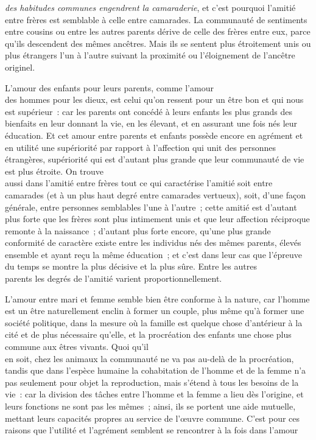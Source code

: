 \documentclass[french,twoside]{book} %
\begin{document}
{\itshape des habitudes communes engendrent la camaraderie}, et c’est pourquoi l’amitié entre frères est semblable à celle entre camarades.  La communauté de sentiments entre cousins ou entre les autres parents dérive de celle des frères entre eux, parce qu’ils descendent des mêmes ancêtres. Mais ils se sentent plus étroitement unis ou plus étrangers l’un à l’autre suivant la proximité ou l’éloignement de l’ancêtre originel.\par
L’amour des enfants pour leurs parents, comme l’amour \\
des hommes pour les dieux, est celui qu’on ressent pour un être bon et qui nous est supérieur : car les parents ont concédé à leurs enfants les plus grands des bienfaits en leur donnant la vie, en les élevant, et en assurant une fois nés leur éducation. Et cet amour entre parents et enfants possède encore en agrément et en utilité une supériorité par rapport à l’affection qui unit des personnes étrangères, supériorité qui est d’autant plus grande que leur communauté de vie est plus étroite. On trouve \\
aussi dans l’amitié entre frères tout ce qui caractérise l’amitié soit entre camarades (et à un plus haut degré entre camarades vertueux), soit, d’une façon générale, entre personnes semblables l’une à l’autre ; cette amitié est d’autant plus forte que les frères sont plus intimement unis et que leur affection réciproque remonte à la naissance ; d’autant plus forte encore, qu’une plus grande conformité de caractère existe entre les individus nés des mêmes parents, élevés ensemble et ayant reçu la même éducation ; et c’est dans leur cas que l’épreuve du temps se montre la plus décisive et la plus sûre. Entre les autres \\
parents les degrés de l’amitié varient proportionnellement.\par
L’amour entre mari et femme semble bien être conforme à la nature, car l’homme est un être naturellement enclin à former un couple, plus même qu’à former une société politique, dans la mesure où la famille est quelque chose d’antérieur à la cité et de plus nécessaire qu’elle, et la procréation des enfants une chose plus commune aux êtres vivants. Quoi qu’il \\
en soit, chez les animaux la communauté ne va pas au-delà de la procréation, tandis que dans l’espèce humaine la cohabitation de l’homme et de la femme n’a pas seulement pour objet la reproduction, mais s’étend à tous les besoins de la vie : car la division des tâches entre l’homme et la femme a lieu dès l’origine, et leurs fonctions ne sont pas les mêmes ; ainsi, ils se portent une aide mutuelle, mettant leurs capacités propres au service de l’œuvre commune. C’est pour ces raisons que l’utilité et l’agrément semblent se rencontrer à la fois dans l’amour \\
\end{document}
